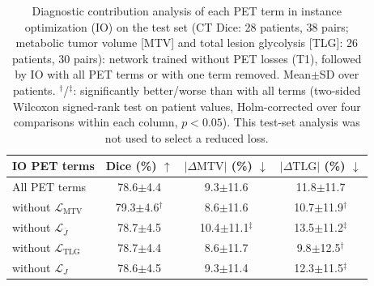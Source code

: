 \begin{table}[t]
\centering
\caption{Diagnostic contribution analysis of each PET term in instance optimization (IO) on the test set (CT Dice: 28 patients, 38 pairs; metabolic tumor volume [MTV] and total lesion glycolysis [TLG]: 26 patients, 30 pairs): network trained without PET losses (T1), followed by IO with all PET terms or with one term removed.
Mean$\pm$SD over patients.
$^{\dagger}$/$^{\ddagger}$: significantly better/worse than with all terms (two-sided Wilcoxon signed-rank test on patient values, Holm-corrected over four comparisons within each column, $p<0.05$).
This test-set analysis was not used to select a reduced loss.}
\label{tab:loo}
\scriptsize
\setlength{\tabcolsep}{3pt}
\begin{tabular}{lccc}
\toprule
IO PET terms & Dice (\%) $\uparrow$ & $|\Delta\mathrm{MTV}|$ (\%) $\downarrow$ & $|\Delta\mathrm{TLG}|$ (\%) $\downarrow$ \\
\midrule
All PET terms & 78.6$\pm$4.4 & 9.3$\pm$11.6 & 11.8$\pm$11.7 \\
\midrule
without $\mathcal{L}_{\mathrm{MTV}}$ & 79.3$\pm$4.6$^{\dagger}$ & 8.6$\pm$11.6 & 10.7$\pm$11.9$^{\dagger}$ \\
without $\mathcal{L}_{\overline{J}}$ & 78.7$\pm$4.5 & 10.4$\pm$11.1$^{\ddagger}$ & 13.5$\pm$11.2$^{\ddagger}$ \\
without $\mathcal{L}_{\mathrm{TLG}}$ & 78.7$\pm$4.4 & 8.6$\pm$11.7 & 9.8$\pm$12.5$^{\dagger}$ \\
without $\mathcal{L}_{J}$ & 78.6$\pm$4.5 & 9.3$\pm$11.4 & 12.3$\pm$11.5$^{\ddagger}$ \\
\bottomrule
\end{tabular}
\end{table}
